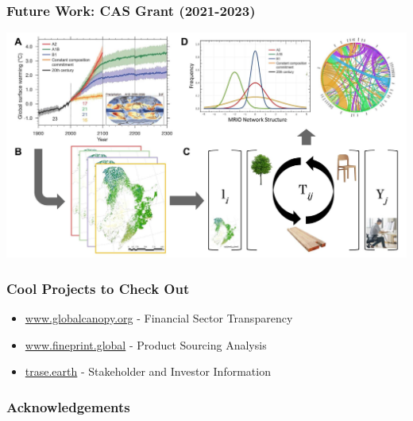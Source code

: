 \documentclass[aspectratio=169]{beamer}
\begin{document}
\begin{frame}
  \frametitle{Future Work: CAS Grant (2021-2023)}
    \begin{center}
     \includegraphics[width=1.0\textwidth]{images/lemrio_climate_change.jpeg}
     \end{center}
\end{frame}


\begin{frame}
  \frametitle{Cool Projects to Check Out}
  \begin{itemize}
  \item \url{www.globalcanopy.org} - Financial Sector Transparency
  \item \url{www.fineprint.global} - Product Sourcing Analysis 
  \item \url{trase.earth} - Stakeholder and Investor Information
  \end{itemize}
\end{frame}


\begin{frame}
  \frametitle{Acknowledgements}
\end{frame}
\end{document}
